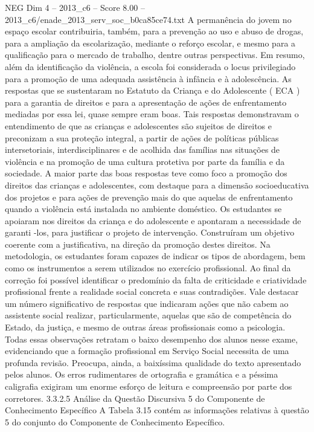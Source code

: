 \begin{textsample}{NEG Dim 4 – 2013\_c6 – Score 8.00 – 2013\_c6/enade\_2013\_serv\_soc\_b0ca85ce74.txt}
A permanência do jovem no espaço escolar contribuiria, também, para a prevenção ao uso e abuso de drogas, para a ampliação da escolarização, mediante o reforço escolar, e mesmo para a qualificação para o mercado de trabalho, dentre outras perspectivas.
Em resumo, além da identificação da violência, a escola foi considerada o locus privilegiado para a promoção de uma adequada assistência à infância e à adolescência.
As respostas que se sustentaram no Estatuto da Criança e do Adolescente ( ECA ) para a garantia de direitos e para a apresentação de ações de enfrentamento mediadas por essa lei, quase sempre eram boas.
Tais respostas demonstravam o entendimento de que as crianças e adolescentes são sujeitos de direitos e preconizam a sua proteção integral, a partir de ações de políticas públicas intersetoriais, interdisciplinares e de acolhida das famílias nas situações de violência e na promoção de uma cultura protetiva por parte da família e da sociedade.
A maior parte das boas respostas teve como foco a promoção dos direitos das crianças e adolescentes, com destaque para a dimensão socioeducativa dos projetos e para ações de prevenção mais do que aquelas de enfrentamento quando a violência está instalada no ambiente doméstico.
Os estudantes se apoiaram nos direitos da criança e do adolescente e apontaram a necessidade de garanti -los, para justificar o projeto de intervenção.
Construíram um objetivo coerente com a justificativa, na direção da promoção destes direitos.
Na metodologia, os estudantes foram capazes de indicar os tipos de abordagem, bem como os instrumentos a serem utilizados no exercício profissional.
Ao final da correção foi possível identificar o predomínio da falta de criticidade e criatividade profissional frente a realidade social concreta e suas contradições.
Vale destacar um número significativo de respostas que indicaram ações que não cabem ao assistente social realizar, particularmente, aquelas que são de competência do Estado, da justiça, e mesmo de outras áreas profissionais como a psicologia.
Todas essas observações retratam o baixo desempenho dos alunos nesse exame, evidenciando que a formação profissional em Serviço Social necessita de uma profunda revisão.
Preocupa, ainda, a baixíssima qualidade do texto apresentado pelos alunos.
Os erros rudimentares de ortografia e gramática e a péssima caligrafia exigiram um enorme esforço de leitura e compreensão por parte dos corretores. 3.3.2.5 Análise da Questão Discursiva 5 do Componente de Conhecimento Específico A Tabela 3.15 contém as informações relativas à questão 5 do conjunto do Componente de Conhecimento Específico.

\end{textsample}
